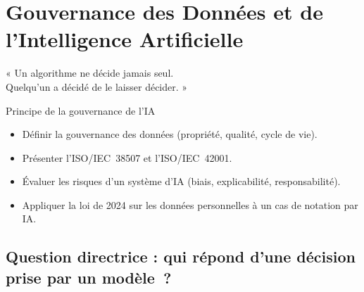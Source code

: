 
\chapter{Gouvernance des Données et de l'Intelligence Artificielle}
\label{chap:donnees-ia}

\epigraph{%
    « Un algorithme ne décide jamais seul.\\
    Quelqu'un a décidé de le laisser décider. »%
}{Principe de la gouvernance de l'IA}


\begin{boxobjectifs}
\begin{itemize}
    \item Définir la gouvernance des données (propriété, qualité, cycle de
          vie).
    \item Présenter l'ISO/IEC~38507 et l'ISO/IEC~42001.
    \item Évaluer les risques d'un système d'IA (biais, explicabilité,
          responsabilité).
    \item Appliquer la loi de 2024 sur les données personnelles à un cas de
          notation par IA.
\end{itemize}
\end{boxobjectifs}

\bigskip

\section*{Question directrice : qui répond d'une décision prise par un modèle~?}

